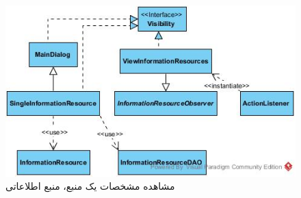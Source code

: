 \begin{landscape}
\begin{figure}[H]
	\includegraphics[scale=0.6]{img/sequence-design/ViewResourceAttributes_INFORMATIONUI}
	\caption{مشاهده مشخصات یک منبع، منبع اطلاعاتی}
\end{figure}

\newpage

\end{landscape}
